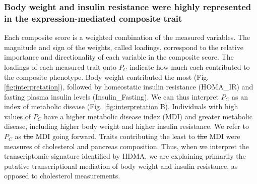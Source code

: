 \documentclass[
]{article}
\providecommand{\DIFdeltex}[1]{{\protect\color{red}\sout{#1}}}                      %
\providecommand{\DIFdelbegin}{} %
\providecommand{\DIFdelend}{} %
\providecommand{\DIFdel}[1]{\texorpdfstring{\DIFdeltex{#1}}{}} %
\newcommand{\DIFscaledelfig}{0.5}
\newlength{\DIFdelgraphicswidth} %
\newlength{\DIFdelgraphicsheight} %
\newcommand{\DIFdelincludegraphics}[2][]{%
\sbox{\DIFdelgraphicsbox}{\DIFOincludegraphics[#1]{#2}}%
\settoboxwidth{\DIFdelgraphicswidth}{\DIFdelgraphicsbox} %
\settoboxtotalheight{\DIFdelgraphicsheight}{\DIFdelgraphicsbox} %
\scalebox{\DIFscaledelfig}{%
\parbox[b]{\DIFdelgraphicswidth}{\usebox{\DIFdelgraphicsbox}\\[-\baselineskip] \rule{\DIFdelgraphicswidth}{0em}}\llap{\resizebox{\DIFdelgraphicswidth}{\DIFdelgraphicsheight}{%
\setlength{\unitlength}{\DIFdelgraphicswidth}%
\begin{picture}(1,1)%
\thicklines\linethickness{2pt} %
{\color[rgb]{1,0,0}\put(0,0){\framebox(1,1){}}}%
{\color[rgb]{1,0,0}\put(0,0){\line( 1,1){1}}}%
{\color[rgb]{1,0,0}\put(0,1){\line(1,-1){1}}}%
\end{picture}%
}\hspace*{3pt}}} %
} %
\DeclareRobustCommand{\DIFdelbegin}{\DIFOdelbegin \let\includegraphics\DIFdelincludegraphics} %
\DeclareRobustCommand{\DIFdelend}{\DIFOaddend \let\includegraphics\DIFOincludegraphics} %
\begin{document}
\subsubsection{Body weight and insulin resistance were highly
represented in the expression-mediated composite
trait}\label{body-weight-and-insulin-resistance-were-highly-represented-in-the-expression-mediated-composite-trait}

Each composite score is a weighted combination of the measured
variables. The magnitude and sign of the weights, called loadings,
correspond to the relative importance and directionality of each
variable in the composite score. The loadings of each measured trait
onto \(P_C\) indicate how much each contributed to the composite
phenotype. Body weight contributed the most (Fig.
\ref{fig:interpretation}), followed by homeostatic insulin resistance
(HOMA\_IR) and fasting plasma insulin levels (Insulin\_Fasting). We can
thus interpret \(P_C\) as an index of metabolic disease (Fig.
\ref{fig:interpretation}B). Individuals with high values of \(P_C\) have
a higher metabolic disease index (MDI) and greater metabolic disease,
including higher body weight and higher insulin resistance. We refer to
\(P_C\) as \DIFdelbegin \DIFdel{the }\DIFdelend MDI going forward. Traits contributing the least to \DIFdelbegin \DIFdel{the
}\DIFdelend MDI were
measures of cholesterol and pancreas composition. Thus, when we
interpret the transcriptomic signature identified by HDMA, we are
explaining primarily the putative transcriptional mediation of body
weight and insulin resistance, as opposed to cholesterol measurements.
\end{document}
